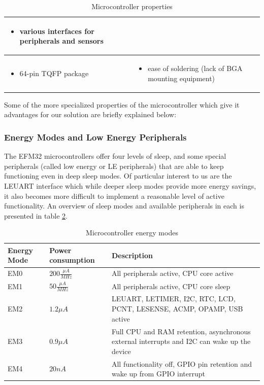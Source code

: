 \begin{table}
\begin{tabular}{|m{}|m{}|}
	\begin{itemize}
	\item various interfaces for peripherals and sensors
	\end{itemize} \\
\hline
	\begin{itemize}
	\item 64-pin TQFP package
	\end{itemize} &
	\begin{itemize}
	\item ease of soldering (lack of BGA mounting equipment)
	\end{itemize} \\
\hline 
\end{tabular} 
\caption{Microcontroller properties}
\label{tab:microcontroller_properties}
\end{table}

Some of the more specialized properties of the microcontroller which give it advantages for our solution are briefly explained below:

\subsubsection*{Energy Modes and Low Energy Peripherals} The EFM32 microcontrollers offer four levels of sleep, and some special peripherals (called low energy or LE peripherals) that are able to keep functioning even in deep sleep modes. Of particular interest to us are the LEUART interface which while deeper sleep modes provide more energy savings, it also becomes more difficult to implement a reasonable level of active functionality. An overview of sleep modes and available peripherals in each is presented in table \ref{tab:microcontroller_modes}.

\begin{table}
\centering
\begin{tabular}{|l|l|m{6cm}|}
\hline
	\textbf{Energy Mode}&
	\textbf{Power consumption}&
	\textbf{Description}  \\ 
\hline
	EM0 &
	$200 \frac{\mu A}{MHz}$ &
	All peripherals active, CPU core active  \\ 
\hline
	EM1 &
	$50 \frac{\mu A}{MHz}$  &
	All peripherals active, CPU core sleep  \\ 
\hline
	EM2 &
	$1.2 \mu A$  &
	LEUART, LETIMER, I2C, RTC, LCD, PCNT, LESENSE, ACMP, OPAMP, USB active  \\ 
\hline
	EM3 &
	$0.9 \mu A$  &
	Full CPU and RAM retention, asynchronous external interrupts and I2C can wake up the device   \\ 
\hline
	EM4 &
	$20 nA$  &
	All functionality off, GPIO pin retention and wake up from GPIO interrupt  \\ 
\hline 
\end{tabular} 
\caption{Microcontroller energy modes}
\label{tab:microcontroller_modes}
\end{table}

